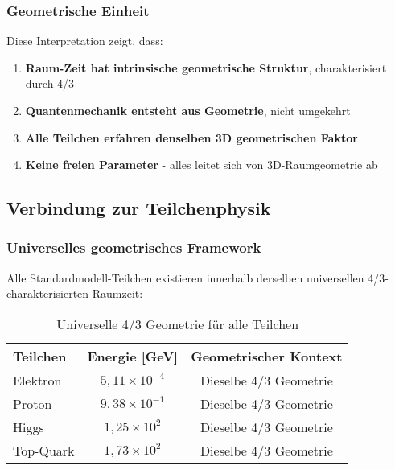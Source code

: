 \documentclass[12pt,a4paper]{article}
\newcommand{\mytimes}{\ensuremath{\times}}
\begin{document}
	\subsubsection{Geometrische Einheit}
	\label{subsubsec:geometrische_einheit}
	
	Diese Interpretation zeigt, dass:
	\begin{enumerate}
		\item \textbf{Raum-Zeit hat intrinsische geometrische Struktur}, charakterisiert durch 4/3
		\item \textbf{Quantenmechanik entsteht aus Geometrie}, nicht umgekehrt
		\item \textbf{Alle Teilchen erfahren denselben 3D geometrischen Faktor}
		\item \textbf{Keine freien Parameter} - alles leitet sich von 3D-Raumgeometrie ab
	\end{enumerate}
	
	\subsection{Verbindung zur Teilchenphysik}
	\label{subsec:verbindung_teilchenphysik}
	
	\subsubsection{Universelles geometrisches Framework}
	\label{subsubsec:universelles_framework}
	
	Alle Standardmodell-Teilchen existieren innerhalb derselben universellen 4/3-charakterisierten Raumzeit:
	
	\begin{table}[htbp]
		\centering
		\begin{tabular}{lcc}
			\toprule
			\textbf{Teilchen} & \textbf{Energie [GeV]} & \textbf{Geometrischer Kontext} \\
			\midrule
			Elektron & $5,11 \mytimes 10^{-4}$ & Dieselbe 4/3 Geometrie \\
			Proton & $9,38 \mytimes 10^{-1}$ & Dieselbe 4/3 Geometrie \\
			Higgs & $1,25 \mytimes 10^{2}$ & Dieselbe 4/3 Geometrie \\
			Top-Quark & $1,73 \mytimes 10^{2}$ & Dieselbe 4/3 Geometrie \\
			\bottomrule
		\end{tabular}
		\caption{Universelle 4/3 Geometrie für alle Teilchen}
		\label{tab:universelle_geometrie}
	\end{table}
	
\end{document}
